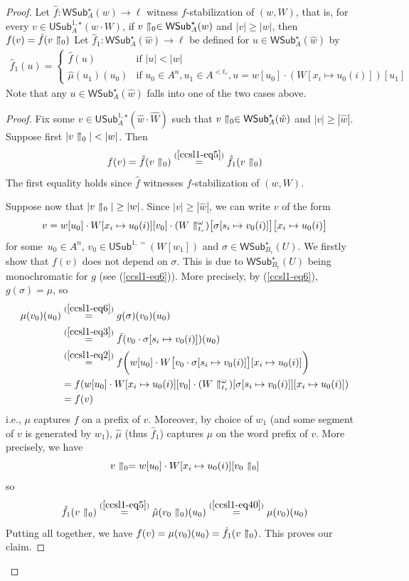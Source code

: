 \documentclass{article}
\newcommand{\USub}{\mathsf{USub}}
\newcommand{\WSub}{\mathsf{WSub}}
\numberwithin{theorem}{section}
\newtheorem{claim}{Claim}
\theoremstyle{definition}
\newcommand{\upupharpoonright}{%
  \upharpoonright
  \mathrel{\mkern-4.5mu}%
  \upharpoonright
}
\newcommand{\uuh}{\upupharpoonright}
\begin{document}
\begin{proof}
Let $\hat f : \WSub^{\star}_A(w) \to \ell$ witness $f$-stabilization of $(w, W)$, that is, for every $v \in \USub^{1,\star}_A(w \cdot W)$, if $v \uuh_0 \in \WSub^{\star}_A(w)$ and $|v| \geq |w|$, then $f(v) = \hat f(v \uuh_0)$
Let $\hat f_1 : \WSub^\star_A(\hat w) \to \ell$ be defined for $u \in \WSub^\star_A(\hat w)$ by
\begin{align}\label{ccsl1-eq5}
\hat f_1(u) = \begin{cases}
    \hat f(u) & \mbox{if } |u| < |w|\\
    \hat \mu(u_1)(u_0) & \mbox{if } u_0\in A^n, u_1\in A^{<t_r}, u = w[u_0] \cdot  (W[x_i \mapsto u_0(i)])[u_1] 
\end{cases}
\end{align}
Note that any $u \in \WSub^\star_A(\hat w)$ falls into one of the two cases above.

\begin{proof}
Fix some $v \in \USub^{1,\star}_A(\hat w \cdot \hat W)$ such that $v \uuh_0 \in \WSub^{\star}_A(\hat w)$ and $|v| \geq |\hat w|$. Suppose first $|v \uuh_0| < |w|$. Then
$$
f(v) = \hat f(v \uuh_0)  \overset{(\ref{ccsl1-eq5})}= \hat f_1(v \uuh_0)
$$
The first equality holds since $\hat f$ witnesses $f$-stabilization of $(w, W)$.

Suppose now that $|v \uuh_0| \geq |w|$. Since $|v| \geq |\hat w|$, we can write $v$ of the form
$$
v = w[u_0] \cdot W[x_i \mapsto u_0(i)][v_0] \cdot (W \uuh_{t_r}^\omega)\big[\sigma[s_i \mapsto v_0(i)]\big]\big[x_i \mapsto u_0(i)\big]
$$
for some~$u_0 \in A^n$, $v_0 \in \USub^{1,=}(W[w_1])$ and $\sigma \in \WSub^{\star}_{B_r}(U)$.
We firstly show that $f(v)$ does not depend on $\sigma$.
This is due to $\WSub^{\star}_{B_r}(U)$ being monochromatic for $g$ (see (\ref{ccsl1-eq6})).
More precisely, by (\ref{ccsl1-eq6}), $g(\sigma) = \mu$, so
\begin{align*}
    \mu(v_0)(u_0)  &  \overset{(\ref{ccsl1-eq6})}= g(\sigma)(v_0)(u_0)\\
    & \overset{(\ref{ccsl1-eq3})}= \bar f(v_0 \cdot \sigma[s_i \mapsto v_0(i)])(u_0)\\
    & \overset{(\ref{ccsl1-eq2})}= f\bigg(w[u_0] \cdot W\big[v_0 \cdot \sigma[s_i \mapsto v_0(i)]\big][x_i \mapsto u_0(i)]\bigg)\\
    & = f(w[u_0] \cdot W[x_i \mapsto u_0(i)][v_0] \cdot (W \uuh_{t_r}^\omega)[\sigma[s_i \mapsto v_0(i)]][x_i \mapsto u_0(i)])\\
    & = f(v)
\end{align*}
i.e., $\mu$ captures $f$ on a prefix of $v$. Moreover, by choice of $w_1$ (and some segment of $v$ is generated by $w_1$), $\hat \mu$ (thus  $\hat f_1$) captures $\mu$ on the word prefix of $v$.
More precisely, we have
$$
v \uuh_0 = w[u_0] \cdot W[x_i \mapsto u_0(i)][v_0 \uuh_0]
$$
so
$$
\hat f_1(v \uuh_0) \overset{(\ref{ccsl1-eq5})}= \hat \mu(v_0 \uuh_0)(u_0) \overset{(\ref{ccsl1-eq40})}= \mu(v_0)(u_0)
$$
Putting all together, we  have $f(v) = \mu(v_0)(u_0) = \hat f_1(v \uuh_0)$.
This proves our claim.
\end{proof}


\end{proof}
\end{document}
